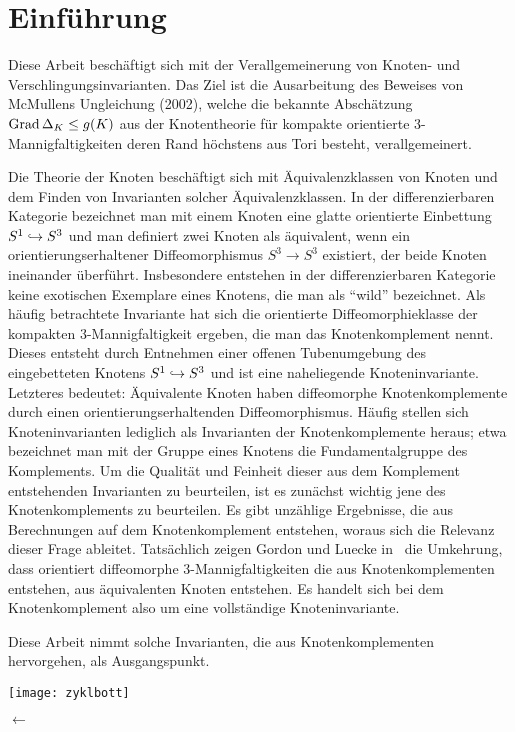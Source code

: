 \section{Einführung}
		
	\begin{minipage}[t][\textheight][t]{0.76\textwidth}

	Diese Arbeit beschäftigt sich mit der Verallgemeinerung von Knoten- und Verschlingungsinvarianten. Das Ziel ist die Ausarbeitung des Beweises von McMullens Ungleichung (2002), welche die bekannte Abschätzung $\operatorname{Grad} \Delta_K \leq g(K)$ aus der Knotentheorie für kompakte orientierte 3-Mannigfaltigkeiten deren Rand höchstens aus Tori besteht, verallgemeinert.

	Die Theorie der Knoten beschäftigt sich mit Äquivalenzklassen von Knoten und dem Finden von Invarianten solcher Äquivalenzklassen. In der differenzierbaren Kategorie bezeichnet man mit einem Knoten eine glatte orientierte Einbettung $S^1\hookrightarrow S^3$ und man definiert zwei Knoten als äquivalent, wenn ein orientierungserhaltener Diffeomorphismus $S^3\to S^3$ existiert, der beide Knoten ineinander überführt. Insbesondere entstehen in der differenzierbaren Kategorie keine exotischen Exemplare eines Knotens, die man als "`wild"' bezeichnet. Als häufig betrachtete Invariante hat sich die orientierte Diffeomorphieklasse der kompakten 3-Mannigfaltigkeit ergeben, die man das Knotenkomplement nennt. Dieses entsteht durch Entnehmen einer offenen Tubenumgebung des eingebetteten Knotens $S^1 \hookrightarrow S^3$ und ist eine naheliegende Knoteninvariante. Letzteres bedeutet: Äquivalente Knoten haben diffeomorphe Knotenkomplemente durch einen orientierungserhaltenden Diffeomorphismus. Häufig stellen sich Knoteninvarianten lediglich als Invarianten der Knotenkomplemente heraus; etwa bezeichnet man mit der Gruppe eines Knotens die Fundamentalgruppe des Komplements. Um die Qualität und Feinheit dieser aus dem Komplement entstehenden Invarianten zu beurteilen, ist es zunächst wichtig jene des Knotenkomplements zu beurteilen. Es gibt unzählige Ergebnisse, die aus Berechnungen auf dem Knotenkomplement entstehen, woraus sich die Relevanz dieser Frage ableitet. Tatsächlich zeigen Gordon und Luecke in~\cite[1989]{Gordon.1989} die Umkehrung, dass orientiert diffeomorphe 3-Mannigfaltigkeiten die aus Knotenkomplementen entstehen, aus äquivalenten Knoten entstehen. Es handelt sich bei dem Knotenkomplement also um eine vollständige Knoteninvariante. 

	Diese Arbeit nimmt solche Invarianten, die aus Knotenkomplementen hervorgehen, als Ausgangspunkt.


	\vfill
	\begin{minipage}[t]{0.7\textwidth}
		\texttt{[image: zyklbott]} 
	\end{minipage}
	\begin{minipage}[t]{0.2\textwidth}
	\vspace{-1cm}
	\huge$\longleftarrow$
	\vfill

	\end{minipage}
	\vspace{.63cm}
		 \label{fig:zykl}
	\end{minipage}

